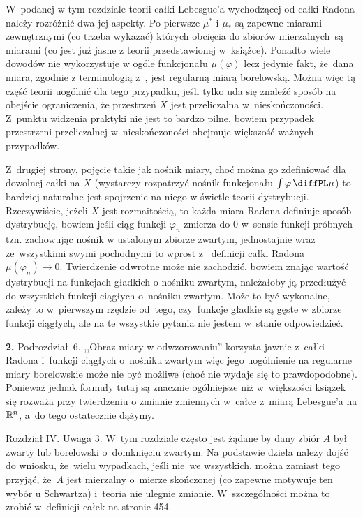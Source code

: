 \documentclass[a4paper,11pt]{article}
\begin{document}
\start W~podanej w tym rozdziale teorii całki Lebesgue'a wychodzącej
od całki Radona należy rozróżnić dwa jej aspekty. Po pierwsze
$\mu^{ * }$ i $\mu_{ * }$ są zapewne miarami zewnętrznymi (co trzeba
wykazać) których obcięcia do zbiorów mierzalnych~są miarami (co jest
już jasne z teorii przedstawionej w~książce). Ponadto wiele dowodów
nie wykorzystuje w ogóle funkcjonału $\mu( \varphi )$ lecz jedynie
fakt, że~dana miara, zgodnie z terminologią z~\cite{Rud86}, jest
regularną miarą borelowską. Można więc tą część teorii uogólnić dla
tego przypadku, jeśli tylko uda się znaleźć sposób na obejście
ograniczenia, że przestrzeń $X$ jest przeliczalna w~nieskończoności.
Z~punktu widzenia praktyki nie jest to bardzo pilne, bowiem przypadek
przestrzeni przeliczalnej w~nieskończoności obejmuje większość ważnych
przypadków.

Z~drugiej strony, pojęcie takie jak nośnik miary, choć można go
zdefiniować dla dowolnej całki na $X$ (wystarczy rozpatrzyć nośnik
funkcjonału $\int \varphi \, \diffPL \mu$) to bardziej naturalne jest
spojrzenie na niego w świetle teorii dystrybucji. Rzeczywiście, jeżeli
$X$ jest rozmaitością, to każda miara Radona definiuje sposób
dystrybucję, bowiem jeśli ciąg funkcji $\varphi_{ n }$ zmierza do 0
w~sensie funkcji próbnych tzn. zachowując nośnik w ustalonym zbiorze
zwartym, jednostajnie wraz ze~wszystkimi swymi pochodnymi to wprost z~
definicji całki Radona $\mu( \varphi_{ n } ) \to 0$. Twierdzenie
odwrotne może nie zachodzić, bowiem znając wartość dystrybucji na
funkcjach gładkich o nośniku zwartym, należałoby ją przedłużyć do
wszystkich funkcji ciągłych o~nośniku zwartym. Może to być wykonalne,
zależy to w~pierwszym rzędzie od~tego, czy~funkcje gładkie są gęste w
zbiorze funkcji ciągłych, ale na te wszystkie pytania nie jestem
w~stanie odpowiedzieć.

\vspace{\spaceFour}


\start \textbf{2.} Podrozdział~6. ,,Obraz miary w odwzorowaniu''
korzysta jawnie z~całki Radona i~funkcji ciągłych o~nośniku zwartym
więc jego uogólnienie na regularne miary borelowskie może nie być
możliwe (choć nie wydaje się to prawdopodobne). Ponieważ jednak
formuły tutaj są znacznie ogólniejsze niż w~większości książek się
rozważa przy twierdzeniu o zmianie zmiennych w~całce z~miarą
Lebesgue'a na $\mathbb{R}^{ n }$, a~do tego ostatecznie dążymy.

\vspace{\spaceFour}


\start Rozdział IV. Uwaga 3. W~tym rozdziale często jest żądane by
dany zbiór $A$ był zwarty lub borelowski o~domknięciu zwartym. Na
podstawie dzieła \cite{VBMTI} należy dojść do wniosku, że~wielu
wypadkach, jeśli nie~we wszystkich, można zamiast tego przyjąć, że~$A$
jest mierzalny o~mierze skończonej (co zapewne motywuje ten wybór u
Schwartza) i~teoria nie ulegnie zmianie. W~szczególności można to
zrobić w~definicji całek na stronie 454.
\end{document}
